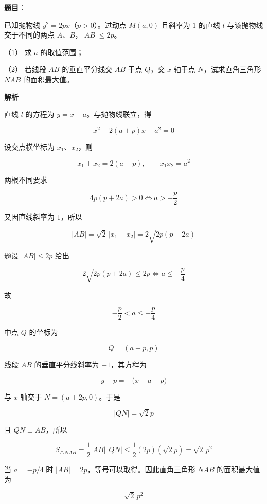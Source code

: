 \begin{answer}

\textbf{题目}：

已知抛物线 $y^2=2px$（$p>0$）。过动点 $M(a,0)$ 且斜率为 $1$ 的直线 $l$ 与该抛物线交于不同的两点 $A\text{、}B$，$|AB|\le2p$。

（1） 求 $a$ 的取值范围；

（2） 若线段 $AB$ 的垂直平分线交 $AB$ 于点 $Q$，交 $x$ 轴于点 $N$，试求直角三角形 $NAB$ 的面积最大值。

\textbf{解析}


直线 $l$ 的方程为 $y=x-a$。与抛物线联立，得

\nopagebreak[4]
\[
x^2-2(a+p)x+a^2=0
\]

设交点横坐标为 $x_1\text{、}x_2$，则

\nopagebreak[4]
\[
x_1+x_2=2(a+p),\qquad x_1x_2=a^2
\]

两根不同要求

\nopagebreak[4]
\[
4p(p+2a)>0
\Longleftrightarrow
a>-\frac p2
\]

又因直线斜率为 $1$，所以

\nopagebreak[4]
\[
|AB|=\sqrt2\,|x_1-x_2|
=2\sqrt{2p(p+2a)}
\]

题设 $|AB|\le2p$ 给出

\nopagebreak[4]
\[
2\sqrt{2p(p+2a)}\le2p
\Longleftrightarrow
a\le-\frac p4
\]


故

\nopagebreak[4]
\[
-\frac p2<a\le-\frac p4
\]

中点 $Q$ 的坐标为

\nopagebreak[4]
\[
Q=(a+p,p)
\]

线段 $AB$ 的垂直平分线斜率为 $-1$，其方程为

\nopagebreak[4]
\[
y-p=-\bigl(x-a-p\bigr)
\]

与 $x$ 轴交于 $N=(a+2p,0)$。于是

\nopagebreak[4]
\[
|QN|=\sqrt2p
\]

且 $QN\perp AB$，所以

\nopagebreak[4]
\[
S_{\triangle NAB}
=\frac12|AB|\,|QN|
\le\frac12(2p)(\sqrt2p)
=\sqrt2\,p^2
\]

当 $a=-p/4$ 时 $|AB|=2p$，等号可以取得。因此直角三角形 $NAB$ 的面积最大值为

\nopagebreak[4]
\[
\sqrt2\,p^2
\]



\end{answer}